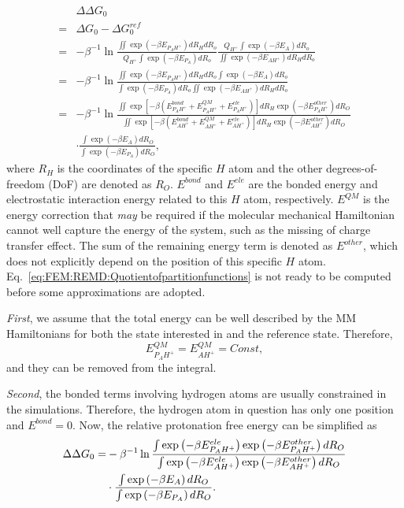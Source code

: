 \begin{align}
	&\Delta\Delta G_{0}\nonumber\\
	= & \Delta G_{0}-\Delta G_{0}^{ref}\nonumber \\
	= & -\beta^{-1}\ln\frac{\iint\exp(-\beta E_{P_{A}H^{+}})dR_{H}dR_{o}}{Q_{H^{+}}\int\exp(-\beta E_{P_{A}})dR_{o}}\frac{Q_{H^{+}}\int\exp(-\beta E_{A})dR_{o}}{\iint\exp(-\beta E_{AH^{+}})dR_{H}dR_{o}}\nonumber \\
	= & -\beta^{-1}\ln\frac{\iint\exp(-\beta E_{P_{A}H^{+}})dR_{H}dR_{o}\int\exp(-\beta E_{A})dR_{o}}{\int\exp(-\beta E_{P_{A}})dR_{o}\iint\exp(-\beta E_{AH^{+}})dR_{H}dR_{o}}\nonumber \\
	= & -\beta^{-1}\ln\frac{\iint\exp{\left[-\beta \left(E_{P_{A}H^{+}}^{bond}+E_{P_{A}H^{+}}^{QM}+E_{P_{A}H^{+}}^{ele}\right)\right]}dR_{H}\exp\left(-\beta E_{P_{A}H^{+}}^{other}\right)dR_{O}}{\iint\exp\left[-\beta \left(E_{AH^{+}}^{bond}+E_{AH^{+}}^{QM}+E_{AH^{+}}^{ele}\right)\right]dR_{H}\exp\left(-\beta E_{AH^{+}}^{other}\right)dR_{O}}\nonumber \\
	 & \cdot\frac{\int\exp\left(-\beta E_{A}\right)dR_{O}}{\int\exp\left(-\beta E_{P_{A}}\right)dR_{O}},\label{eq:FEM:REMD:Quotientofpartitionfunctions}
\end{align}
where $R_{H}$ is the coordinates of the specific $H$ atom and the
other degrees-of-freedom (DoF) are denoted as $R_{O}$. $E^{bond}$
and $E^{ele}$ are the bonded energy and electrostatic interaction
energy related to this $H$ atom, respectively. $E^{QM}$ is the energy
correction that \textit{may} be required if the molecular mechanical
Hamiltonian cannot well capture the energy of the system, such as
the missing of charge transfer effect. The sum of the remaining energy
term is denoted as $E^{other}$, which does not explicitly depend
on the position of this specific $H$ atom. Eq.~\ref{eq:FEM:REMD:Quotientofpartitionfunctions}
is not ready to be computed before some approximations are adopted. 

\textit{First}, we assume that the total energy can be well described by the MM Hamiltonians
for both the state interested in and the reference state. Therefore,
\[
E_{P_{A}H^{+}}^{QM}=E_{AH^{+}}^{QM}=Const,
\]
and they can be removed from the integral. 

\textit{Second}, the bonded terms involving hydrogen atoms are usually 
constrained in the simulations. Therefore, the hydrogen atom in question has 
only one position and $E^{bond}=0$. Now, the 
relative protonation free energy can be simplified as
\begin{align}
\Delta\Delta G_{0}=&-\beta^{-1}\ln\frac{\int\exp\left(-\beta E_{P_{A}H^{+}}^{ele}\right)\exp\left(-\beta E_{P_{A}H^{+}}^{other}\right)dR_{O}}{\int\exp\left(-\beta E_{AH^{+}}^{ele}\right)\exp\left(-\beta E_{AH^{+}}^{other}\right)dR_{O}}\notag\\
&\cdot\frac{\int\exp\left(-\beta E_{A}\right)dR_{O}}{\int\exp\left(-\beta E_{P_{A}}\right)dR_{O}}.
\end{align}

